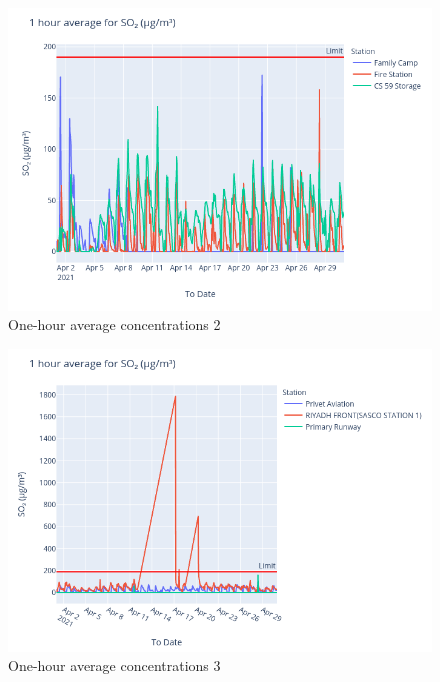 \documentclass[12pt, oneside]{book}
\begin{document}
{
{\begin{figure}[H]
\centering
\includegraphics[width=\textwidth]{image197}
\caption{One-hour average  concentrations 2}\label{image197}
\end{figure}}{}


{\begin{figure}[H]
\centering
\includegraphics[width=\textwidth]{image209}
\caption{One-hour average  concentrations 3}\label{image209}
\end{figure}}{}

}
\end{document}
